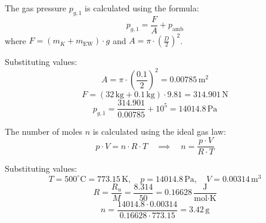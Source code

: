 The gas pressure \( p_{g,1} \) is calculated using the formula:  
\[
p_{g,1} = \frac{F}{A} + p_{\text{amb}}
\]  
where \( F = (m_K + m_{\text{EW}}) \cdot g \) and \( A = \pi \cdot \left(\frac{D}{2}\right)^2 \).  

Substituting values:  
\[
A = \pi \cdot \left(\frac{0.1}{2}\right)^2 = 0.00785 \, \text{m}^2
\]  
\[
F = (32 \, \text{kg} + 0.1 \, \text{kg}) \cdot 9.81 = 314.901 \, \text{N}
\]  
\[
p_{g,1} = \frac{314.901}{0.00785} + 10^5 = 14014.8 \, \text{Pa}
\]  

The number of moles \( n \) is calculated using the ideal gas law:  
\[
p \cdot V = n \cdot R \cdot T \quad \implies \quad n = \frac{p \cdot V}{R \cdot T}
\]  

Substituting values:  
\[
T = 500^\circ\text{C} = 773.15 \, \text{K}, \quad p = 14014.8 \, \text{Pa}, \quad V = 0.00314 \, \text{m}^3
\]  
\[
R = \frac{R_u}{M} = \frac{8.314}{50} = 0.16628 \, \frac{\text{J}}{\text{mol·K}}
\]  
\[
n = \frac{14014.8 \cdot 0.00314}{0.16628 \cdot 773.15} = 3.42 \, \text{g}
\]